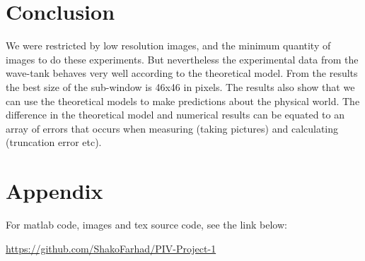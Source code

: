 \documentclass[english,a4paper,12pt]{article}
\begin{document}
\section*{Conclusion}
We were restricted by low resolution images, and the minimum quantity of images to do these experiments. But nevertheless the experimental data from the wave-tank behaves very well according to the theoretical model. From the results the best size of the sub-window is 46x46 in pixels. The results also show that we can use the theoretical models to make predictions about the physical world. The difference in the theoretical model and numerical results can be equated to an array of errors that occurs when measuring (taking pictures) and calculating (truncation error etc).

\section*{Appendix}
For matlab code, images and tex source code, see the link below:

\url{https://github.com/ShakoFarhad/PIV-Project-1}


 \bigskip \bigskip
\end{document}
